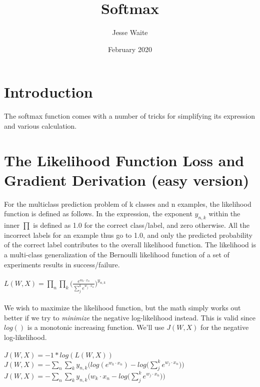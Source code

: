 \documentclass{article}
\title{Softmax}
\author{Jesse Waite}
\date{February 2020}
\begin{document}
\maketitle

\section{Introduction}
The softmax function comes with a number of tricks for simplifying its expression and various calculation.



\section{The Likelihood Function Loss and Gradient Derivation (easy version)}

For the multiclass prediction problem of k classes and n examples, the likelihood function is defined as follows. In the expression, the exponent $y_{n,k}$ within the inner $\prod$ is defined as 1.0 for the correct class/label, and zero otherwise. All the incorrect labels for an example thus go to 1.0, and only the predicted probability of the correct label contributes to the overall likelihood function. The likelihood is a multi-class generalization of the Bernoulli likelihood function of a set of experiments results in success/failure.
\\ \\

$L(W,X) = \prod_{n} \prod_{k} \Big(\frac{e^{w_{k} \cdot x_{n}}}{\sum_{j}^{k} e^{w_{j} \cdot x_{n}}}\Big)^{y_{n,k}}$ 
\\ \\

We wish to maximize the likelihood function, but the math simply works out better if we try to \textit{minimize} the negative log-likelihood instead. This is valid since $log()$ is a monotonic increasing function. We'll use $J(W,X)$ for the negative log-likelihood.
\\ \\

$J(W,X) = -1 * log(L(W,X)) $ \\

$J(W,X) = - \sum_{n} \sum_{k} y_{n,k}\Big(log(e^{w_{k} \cdot x_{n}}) - log\big(\sum_{j}^{k} e^{w_{j} \cdot x_{n}}\big)\Big)$  \\

$J(W,X) = - \sum_{n} \sum_{k} y_{n,k}\Big(w_{k} \cdot x_{n} - log\big(\sum_{j}^{k} e^{w_{j} \cdot x_{n}}\big)\Big)$ \\
\end{document}
